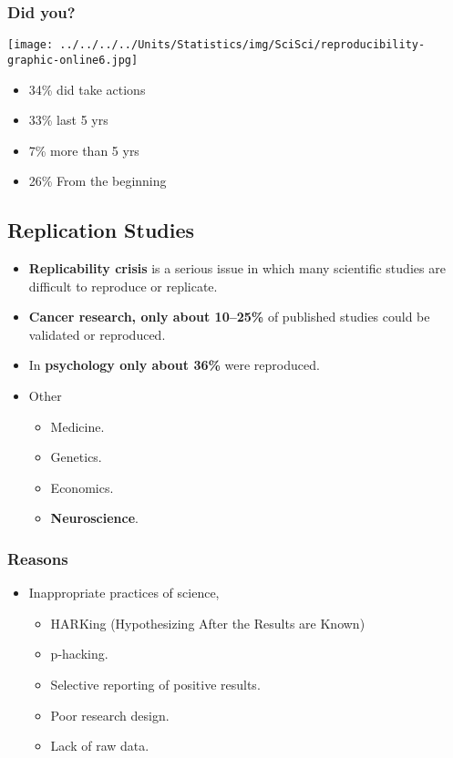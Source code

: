 \documentclass[10pt,article]{article}
\begin{document}
\subsubsection{Did you?}
\label{sec:orgc4ebec8}
\begin{center}
\texttt{[image: ../../../../Units/Statistics/img/SciSci/reproducibility-graphic-online6.jpg]}
\end{center}
\begin{itemize}
\item 34\% did take actions
\item 33\% last 5 yrs
\item 7\% more than 5 yrs
\item 26\% From the beginning
\end{itemize}

\subsection{Replication Studies}
\label{sec:org5f53bad}
\begin{itemize}
\item \textbf{Replicability crisis} is a serious issue in which many scientific studies are difficult to reproduce or replicate.
\end{itemize}
\begin{itemize}
\item \textbf{Cancer research, only about 10–25\%} of published studies could be validated or reproduced.
\item In \textbf{psychology only about 36\%} were reproduced.
\end{itemize}
\begin{itemize}
\item Other
\begin{itemize}
\item Medicine.
\item Genetics.
\item Economics.
\item \textbf{Neuroscience}.
\end{itemize}
\end{itemize}

\subsubsection{Reasons}
\label{sec:org8d7dc0f}
\begin{itemize}
\item Inappropriate practices of science,
\begin{itemize}
\item HARKing (Hypothesizing After the Results are Known)
\item p-hacking.
\item Selective reporting of positive results.
\item Poor research design.
\item Lack of raw data.
\end{itemize}
\end{itemize}
\end{document}
